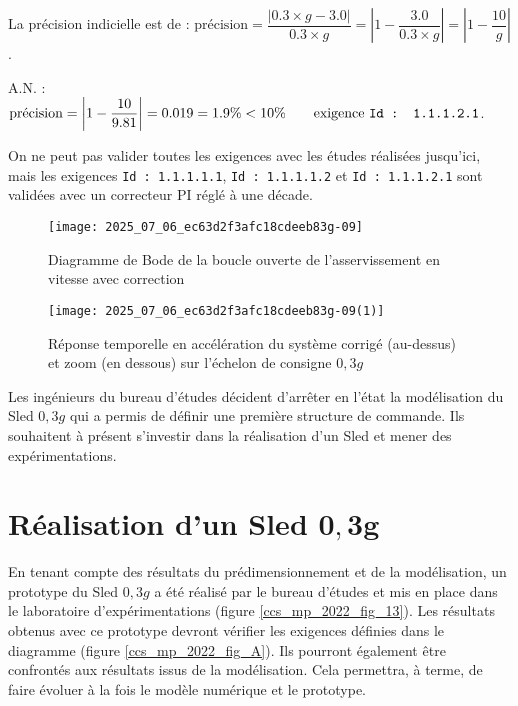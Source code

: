 \ifprof
\begin{corrige}
La précision indicielle est de :
$ \text{précision} = \dfrac{|0.3\times g - 3.0|}{0.3 \times g} = \left|1 - \dfrac{3.0}{0.3 \times g} \right| = \left|1 - \dfrac{10}{g}\right|$.

A.N. : $ \text{précision} = \left|1 -\dfrac{10}{9.81}\right| = 0.019 = 1.9\% < 10\% \qquad \text{exigence \texttt{Id : 1.1.1.2.1}}$.

On ne peut pas valider toutes les exigences avec les études réalisées jusqu'ici, mais les exigences \texttt{Id : 1.1.1.1.1}, \texttt{Id : 1.1.1.1.2} et \texttt{Id : 1.1.1.2.1} sont validées avec un correcteur PI réglé à une décade.
\end{corrige}
\else
\fi


\ifprof
\else
\begin{figure}[!h]
\centering
\texttt{[image: 2025\_07\_06\_ec63d2f3afc18cdeeb83g-09]}

\caption{\label{ccs_mp_2022_fig_11}Diagramme de Bode de la boucle ouverte de l'asservissement en vitesse avec correction}
\end{figure}

\begin{figure}[!h]
\centering
\texttt{[image: 2025\_07\_06\_ec63d2f3afc18cdeeb83g-09(1)]}

\caption{\label{ccs_mp_2022_fig_12}Réponse temporelle en accélération du système corrigé (au-dessus) et zoom (en dessous) sur l'échelon de consigne $0,3 g$}
\end{figure}

Les ingénieurs du bureau d'études décident d'arrêter en l'état la modélisation du Sled $0,3 g$ qui a permis de définir une première structure de commande. Ils souhaitent à présent s'investir dans la réalisation d'un Sled et mener des expérimentations.
\fi

\section{Réalisation d'un Sled $\mathbf{0 , 3 g}$ \label{ccs_mp_2022_sec_4}}

\ifprof
\else
En tenant compte des résultats du prédimensionnement et de la modélisation, un prototype du Sled $0,3 g$ a été réalisé par le bureau d'études et mis en place dans le laboratoire d'expérimentations (figure \ref{ccs_mp_2022_fig_13}). Les résultats obtenus avec ce prototype devront vérifier les exigences définies dans le diagramme (figure \ref{ccs_mp_2022_fig_A}). Ils pourront également être confrontés aux résultats issus de la modélisation. Cela permettra, à terme, de faire évoluer à la fois le modèle numérique et le prototype.\\


